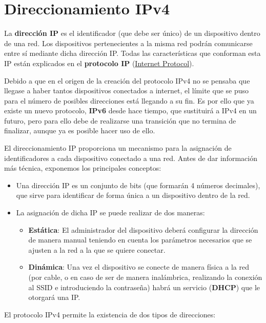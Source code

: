 \chapter{Direccionamiento IPv4}

La \textbf{dirección IP} es el identificador (que debe ser único) de un dispositivo dentro de una red. Los dispositivos pertenecientes a la misma red podrán comunicarse entre sí mediante dicha dirección IP. Todas las características que conforman esta IP están explicados en el \textbf{protocolo IP} (\href{https://es.wikipedia.org/wiki/Protocolo_de_internet}{Internet Protocol}).

Debido a que en el origen de la creación del protocolo IPv4 no se pensaba que llegase a haber tantos dispositivos conectados a internet, el límite que se puso para el número de posibles direcciones está llegando a su fin. Es por ello que ya existe un nuevo protocolo, \textbf{IPv6} desde hace tiempo, que sustituirá a IPv4 en un futuro, pero para ello debe de realizarse una transición que no termina de finalizar, aunque ya es posible hacer uso de ello.

El direccionamiento IP proporciona un mecanismo para la asignación de identificadores a cada dispositivo conectado a una red. Antes de dar información más técnica, exponemos los principales conceptos:

\begin{itemize}
    \item Una dirección IP es un conjunto de bits (que formarán 4 números decimales), que sirve para identificar de forma única a un dispositivo dentro de la red.
    \item La asignación de dicha IP se puede realizar de dos maneras:
    \begin{itemize}
        \item \textbf{Estática}: El administrador del dispositivo deberá configurar la dirección de manera manual teniendo en cuenta los parámetros necesarios que se ajusten a la red a la que se quiere conectar.
        \item \textbf{Dinámica}: Una vez el dispositivo se conecte de manera física a la red (por cable, o en caso de ser de manera inalámbrica, realizando la conexión  al SSID e introduciendo la contraseña) habrá un servicio (\textbf{DHCP}) que le otorgará una IP.
    \end{itemize}
\end{itemize}

El protocolo IPv4 permite la existencia de dos tipos de direcciones:

